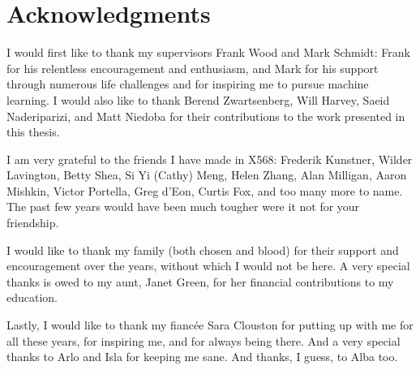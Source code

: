 
\chapter{Acknowledgments}

I would first like to thank my supervisors Frank Wood and Mark Schmidt: Frank for his relentless encouragement and enthusiasm, and Mark for his support through numerous life challenges and for inspiring me to pursue machine learning. I would also like to thank Berend Zwartsenberg, Will Harvey, Saeid Naderiparizi, and Matt Niedoba for their contributions to the work presented in this thesis.

I am very grateful to the friends I have made in X568: Frederik Kunstner, Wilder Lavington, Betty Shea, Si Yi (Cathy) Meng, Helen Zhang, Alan Milligan, Aaron Mishkin, Victor Portella, Greg d'Eon, Curtis Fox, and too many more to name. The past few years would have been much tougher were it not for your friendship. 

I would like to thank my family (both chosen and blood) for their support and encouragement over the years, without which I would not be here. A very special thanks is owed to my aunt, Janet Green, for her financial contributions to my education. 

Lastly, I would like to thank my fiancée Sara Clouston for putting up with me for all these years, for inspiring me, and for always being there. And a very special thanks to Arlo and Isla for keeping me sane. And thanks, I guess, to Alba too.  

